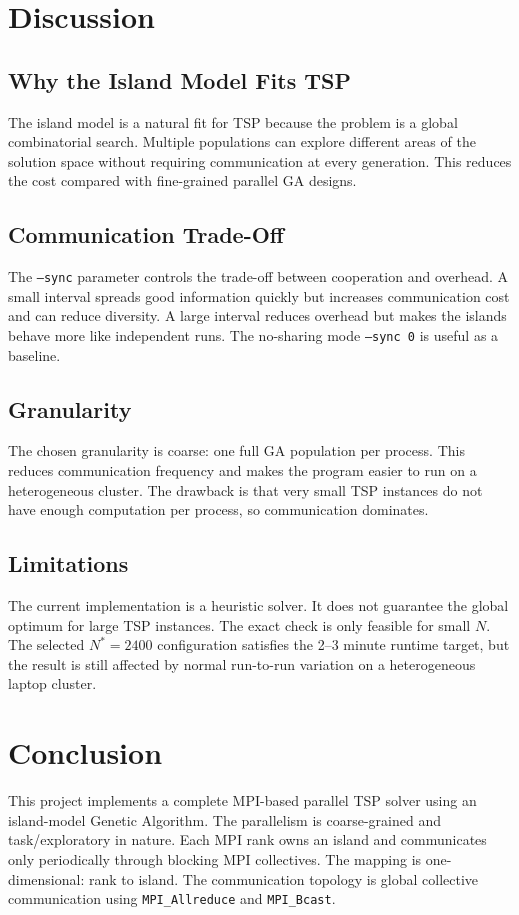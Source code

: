 \documentclass[11pt,a4paper]{article}
\begin{document}
\section{Discussion}

\subsection{Why the Island Model Fits TSP}
The island model is a natural fit for TSP because the problem is a global
combinatorial search. Multiple populations can explore different areas of the
solution space without requiring communication at every generation. This reduces
the cost compared with fine-grained parallel GA designs.

\subsection{Communication Trade-Off}
The \texttt{--sync} parameter controls the trade-off between cooperation and
overhead. A small interval spreads good information quickly but increases
communication cost and can reduce diversity. A large interval reduces overhead
but makes the islands behave more like independent runs. The no-sharing mode
\texttt{--sync 0} is useful as a baseline.

\subsection{Granularity}
The chosen granularity is coarse: one full GA population per process. This
reduces communication frequency and makes the program easier to run on a
heterogeneous cluster. The drawback is that very small TSP instances do not have
enough computation per process, so communication dominates.

\subsection{Limitations}
The current implementation is a heuristic solver. It does not guarantee the
global optimum for large TSP instances. The exact check is only feasible for
small $N$. The selected $N^*=2400$ configuration satisfies the 2--3 minute
runtime target, but the result is still affected by normal run-to-run variation
on a heterogeneous laptop cluster.

\section{Conclusion}
This project implements a complete MPI-based parallel TSP solver using an
island-model Genetic Algorithm. The parallelism is coarse-grained and
task/exploratory in nature. Each MPI rank owns an island and communicates only
periodically through blocking MPI collectives. The mapping is one-dimensional:
rank to island. The communication topology is global collective communication
using \texttt{MPI\_Allreduce} and \texttt{MPI\_Bcast}.
\end{document}
